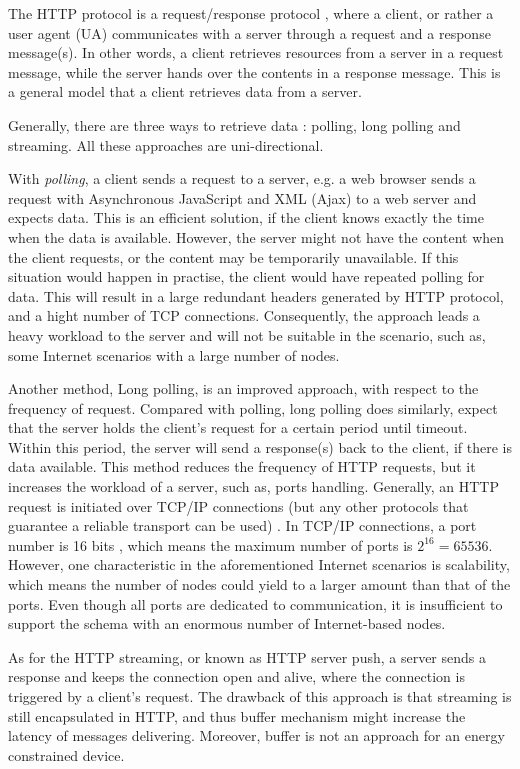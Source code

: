 The HTTP protocol is a request/response protocol \cite{fielding1999hypertext}, where a client, or rather a user agent (UA) communicates with a server through a request and a response message(s). In other words, a client retrieves resources from a server in a request message, while the server hands over the contents in a response message. This is a general model that a client retrieves data from a server. 

Generally, there are three ways to retrieve data \cite{lubbers2010html5}: polling, long polling and streaming. All these approaches are uni-directional. 

With \emph{polling}, a client sends a request to a server, e.g. a web browser sends a request with Asynchronous JavaScript and XML (Ajax) \cite{garrett2005ajax} to a web server and expects data. This is an efficient solution, if the client knows exactly the time when the data is available. However, the server might not have the content when the client requests, or the content may be temporarily unavailable. If this situation would happen in practise, the client would have repeated polling for data. This will result in a large redundant headers generated by HTTP protocol, and a hight number of TCP connections. Consequently, the approach leads a heavy workload to the server and will not be suitable in the scenario, such as, some Internet scenarios with a large number of nodes. 

Another method, Long polling, is an improved approach, with respect to the frequency of request. Compared with polling, long polling does similarly, expect that the server holds the client's request for a certain period until timeout. Within this period, the server will send a response(s) back to the client, if there is data available. This method reduces the frequency of HTTP requests, but it increases the workload of a server, such as, ports handling. Generally, an HTTP request is initiated over TCP/IP connections (but any other protocols that guarantee a reliable transport can be used) \cite {fielding1999hypertext}. In TCP/IP connections, a port number is 16 bits \cite{postel2003rfc}, which means the maximum number of ports is \(  2^16  = 65536 \). However, one characteristic in the aforementioned Internet scenarios is scalability, which means the number of nodes could yield to a larger amount than that of the ports. Even though all ports are dedicated to communication, it is insufficient to support the schema with an enormous number of Internet-based nodes. 

As for the HTTP streaming, or known as HTTP server push, a server sends a response and keeps the connection open and alive, where the connection is triggered by a client's request. The drawback of this approach is that streaming is still encapsulated in HTTP, and thus buffer mechanism might increase the latency of messages delivering. Moreover, buffer is not an approach for an energy constrained device.

